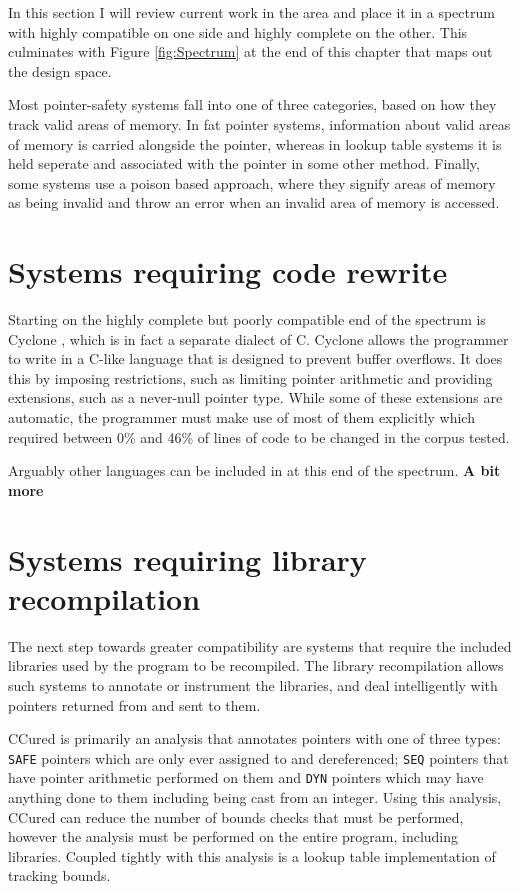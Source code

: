 In this section I will review current work in the area and place it in a spectrum with highly compatible on one side and highly complete on the other.
This culminates with Figure \ref{fig:Spectrum} at the end of this chapter that maps out the design space.

Most pointer-safety systems fall into one of three categories, based on how they track valid areas of memory.
In fat pointer systems, information about valid areas of memory is carried alongside the pointer, whereas in lookup table systems it is held seperate and associated with the pointer in some other method.
Finally, some systems use a poison based approach, where they signify areas of memory as being invalid and throw an error when an invalid area of memory is accessed.

\section{Systems requiring code rewrite}
Starting on the highly complete but poorly compatible end of the spectrum is Cyclone \cite{jim2002cyclone}, which is in fact a separate dialect of C.
Cyclone allows the programmer to write in a C-like language that is designed to prevent buffer overflows.
It does this by imposing restrictions, such as limiting pointer arithmetic and providing extensions, such as a never-null pointer type.
While some of these extensions are automatic, the programmer must make use of most of them explicitly which required between 0\% and 46\% of lines of code to be changed in the corpus tested.

Arguably other languages can be included in at this end of the spectrum. \textbf{A bit more}

\section{Systems requiring library recompilation}

The next step towards greater compatibility are systems that require the included libraries used by the program to be recompiled.
The library recompilation allows such systems to annotate or instrument the libraries, and deal intelligently with pointers returned from and sent to them.

CCured \cite{necula2002ccured} is primarily an analysis that annotates pointers with one of three types: \verb!SAFE! pointers which are only ever assigned to and dereferenced; \verb!SEQ! pointers that have pointer arithmetic performed on them and \verb!DYN! pointers which may have anything done to them including being cast from an integer.
Using this analysis, CCured can reduce the number of bounds checks that must be performed, however the analysis must be performed on the entire program, including libraries.
Coupled tightly with this analysis is a lookup table implementation of tracking bounds.

